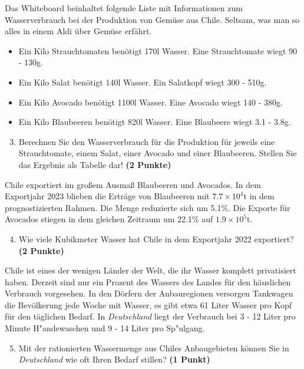 \documentclass[a4paper, 9pt]{scrartcl}\usepackage[]{graphicx}\usepackage[]{xcolor}
\begin{document}
Das Whiteboard beinhaltet folgende Liste mit Informationen zum Wasserverbrauch bei der Produktion von Gemüse aus Chile. Seltsam, was man so alles in einem Aldi über Gemüse erfährt.
  
\begin{itemize}[noitemsep]
\item Ein Kilo Strauchtomaten benötigt 170l Wasser. Eine Strauchtomate wiegt 90 - 130g.
\item Ein Kilo Salat benötigt 140l Wasser. Ein Salatkopf wiegt 300 - 510g.
\item Ein Kilo Avocado benötigt 1100l Wasser. Eine Avocado wiegt 140 - 380g.
\item Ein Kilo Blaubeeren benötigt 820l Wasser. Eine Blaubeere wiegt 3.1 - 3.8g.
\end{itemize}

\begin{enumerate}
  \setcounter{enumi}{2}
\item Berechnen Sie den Wasserverbrauch für die Produktion für jeweils eine Strauchtomate, einem Salat, einer Avocado und einer Blaubeeren. Stellen Sie das Ergebnis als Tabelle dar! \textbf{(2 Punkte)}
\end{enumerate}

Chile exportiert im großem Ausmaß Blaubeeren und Avocados. In dem Exportjahr 2023 blieben die Erträge von Blaubeeren mit \ensuremath{7.7\times 10^{4}}t in dem prognostizierten Rahmen. Die Menge reduzierte sich um 5.1\%. Die Exporte für Avocados stiegen in dem gleichen Zeitraum um 22.1\% auf \ensuremath{1.9\times 10^{5}}t.

\begin{enumerate}
  \setcounter{enumi}{3}
\item Wie viele Kubikmeter Wasser hat Chile in dem Exportjahr 2022 exportiert? \textbf{(2 Punkte)}
\end{enumerate}

Chile ist eines der wenigen Länder der Welt, die ihr Wasser komplett privatisiert haben. Derzeit sind nur ein Prozent des Wassers des Landes für den häuslichen Verbrauch vorgesehen. In den Dörfern der Anbauregionen versorgen Tankwagen die Bevölkerung jede Woche mit Wasser, es gibt etwa 61 Liter Wasser pro Kopf für den täglichen Bedarf. In \textit{Deutschland} liegt der Verbrauch bei 3 - 12 Liter pro Minute H{"a}ndewaschen und 9 - 14 Liter pro Sp{"u}lgang.

\begin{enumerate}
  \setcounter{enumi}{4}
\item Mit der rationierten Wassermenge aus Chiles Anbaugebieten können Sie in \textit{Deutschland} wie oft Ihren Bedarf stillen? \textbf{(1 Punkt)}
\end{enumerate}
\end{document}
